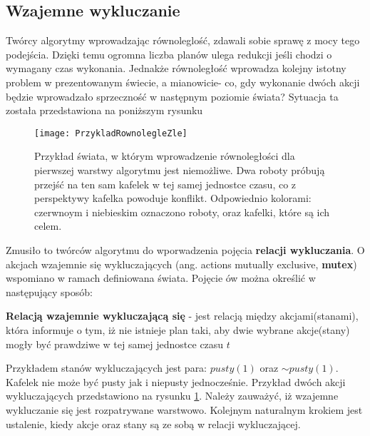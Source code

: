     \subsection{Wzajemne wykluczanie}
    Twórcy algorytmy wprowadzając równoleglość, zdawali sobie sprawę z mocy tego podejścia. Dzięki temu ogromna liczba planów ulega redukcji
    jeśli chodzi o wymagany czas wykonania. Jednakże równoległość wprowadza kolejny istotny problem w prezentowanym świecie, a mianowicie- co, gdy
    wykonanie dwóch akcji będzie wprowadzało sprzeczność w następnym poziomie świata? Sytuacja ta została przedstawiona na poniższym rysunku
    \begin{figure}[H]
        \texttt{[image: PrzykladRownolegleZle]}
        \centering
        \caption{Przykład świata, w którym wprowadzenie równoległości dla pierwszej warstwy algorytmu jest niemożliwe. 
        Dwa roboty próbują przejść na ten sam kafelek
        w tej samej jednostce czasu, co z perspektywy kafelka powoduje konflikt. Odpowiednio kolorami:
        czerwnoym i niebieskim oznaczono roboty, oraz kafelki, które są ich celem.}
        \label{PrzykladRownolegle}
    \end{figure}
    
    Zmusiło to twórców algorytmu do wporwadzenia pojęcia \textbf{relacji wykluczania}. 
    O akcjach wzajemnie się wykluczających (ang. actions mutually exclusive, \textbf{mutex}) wspomiano w ramach definiowana świata. Pojęcie ów można 
    określić w następujący sposób:
    \begin{definition}
        \label{Warstwa}
        \textbf{Relacją wzajemnie wykluczającą się} - jest relacją między akcjami(stanami), która informuje o tym, iż nie istnieje plan taki,
        aby dwie wybrane akcje(stany) mogły być prawdziwe w tej samej jednostce czasu $t$
    \end{definition}
    Przykładem stanów wykluczających jest para: $pusty(1)$ oraz $\sim pusty(1)$. Kafelek nie może być pusty jak i niepusty jednocześnie.
    Przykład dwóch akcji wykluczających przedstawiono na rysunku \ref{PrzykladRownolegle}. Należy zauważyć, iż wzajemne wykluczanie się 
    jest rozpatrywane warstwowo.
    Kolejnym naturalnym krokiem jest ustalenie, kiedy akcje oraz stany są ze sobą w relacji wykluczającej. 

